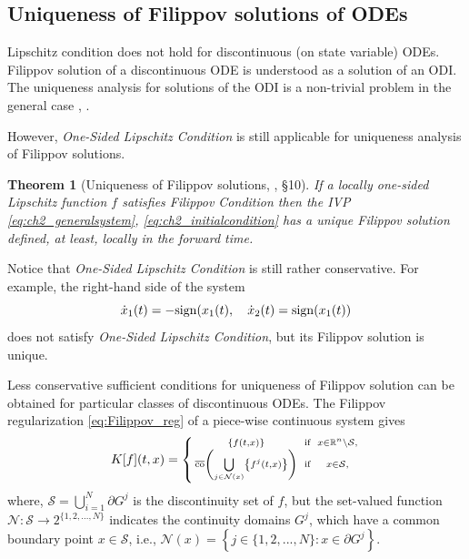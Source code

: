 \documentclass{article}
\newcommand{\R}{\mathbb{R}}
\newcommand{\co}{\mathrm{co}}
\newcommand{\sign}{\mathrm{sign}}
\newtheorem{theorem}{Theorem}
\begin{document}
\subsection{Uniqueness of Filippov solutions of ODEs}
Lipschitz condition
	does not hold for discontinuous (on  state variable) ODEs.
	Filippov solution of a discontinuous ODE is understood as a solution of an ODI.  The uniqueness analysis for solutions of the ODI  is a non-trivial problem in the general case  \cite{Filippov1988:Book}, \cite{Tolstonogov2000:Book}. 
{However, \textit{One-Sided Lipschitz Condition} is still applicable for uniqueness analysis of Filippov solutions.
\begin{theorem}[Uniqueness of Filippov solutions, \cite{Filippov1988:Book}, \S10]	\itshape \label{thm:uniqne_Filippov}
If  a locally one-sided Lipschitz function $f$ satisfies  Filippov Condition then the IVP \eqref{eq:ch2_generalsystem}, \eqref{eq:ch2_initialcondition} has a unique  Filippov solution defined, at least, locally in the forward time.
\end{theorem}

Notice that \textit{One-Sided Lipschitz Condition} is still rather conservative.
For example, the right-hand side of the system \vspace{-1mm}
\begin{equation}\label{eq:ex_uniqness}
\dot x_1(t)=-\sign(x_1(t), \quad \dot x_2(t)=\sign(x_1(t))\vspace{-1mm}
\end{equation}  does not satisfy \textit{One-Sided Lipschitz Condition}, but its Filippov solution is unique. 
}
  Less conservative sufficient conditions for uniqueness of Filippov solution can be obtained for particular classes of discontinuous ODEs. 
  The Filippov regularization \eqref{eq:Filippov_reg}  of a piece-wise continuous system  gives\vspace{-1mm}
\begin{equation}\label{eq:K[f]}
	K[f](t,x)=\left\{
	\begin{smallmatrix}
		\{f(t,x)\} & \text{ if } & x\in \R^{n}\backslash \mathcal{S},\\
		\overline{\co}\left( \bigcup\limits_{j\in \mathcal{N}(x)}\left\{f^j(t,x)\right\} \right) & \text{ if } & x\in \mathcal{S},
	\end{smallmatrix}
	\right.\vspace{-1mm}
\end{equation}
where, $\mathcal{S}=\bigcup_{i=1}^N \partial G^j$ is the discontinuity set of $f$, but 
the set-valued function $\mathcal{N}: \mathcal{S} \to 2^{\{1,2,...,N\}}$ 
indicates the continuity domains $G^{j}$, which have a common boundary point $x\in\mathcal{S}$, i.e.,
$
\mathcal{N}(x)=\left\{j\in\{1,2,...,N\} : x\in \partial G^j \right\}.
$ 
\end{document}
